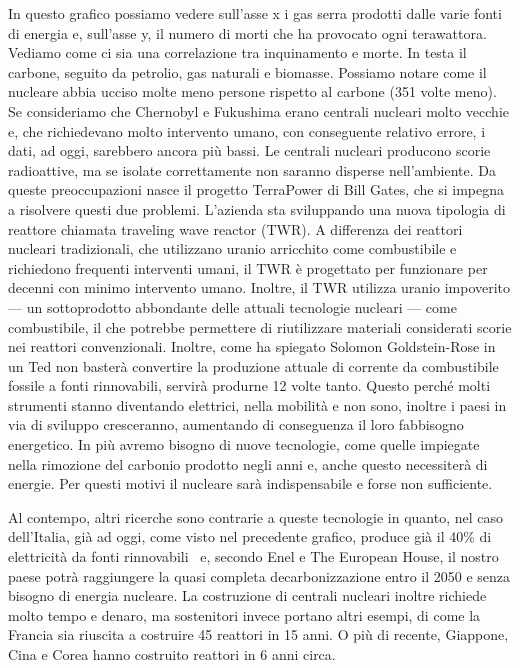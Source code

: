 \documentclass[12pt]{book} %
\begin{document}
In questo grafico possiamo vedere sull'asse x i gas serra prodotti dalle varie fonti di energia e,
sull'asse y, il numero di morti che ha provocato ogni terawattora. Vediamo come ci sia una
correlazione tra inquinamento e morte. In testa il carbone, seguito da petrolio, gas naturali e biomasse. Possiamo
notare come il nucleare abbia ucciso molte meno persone rispetto al carbone (351 volte meno). Se consideriamo che
Chernobyl e Fukushima erano centrali nucleari molto vecchie e, che richiedevano molto intervento umano, con conseguente
relativo errore, i dati, ad oggi, sarebbero ancora più bassi. Le centrali nucleari producono scorie radioattive,
ma se isolate correttamente non saranno disperse nell'ambiente. Da queste preoccupazioni nasce il progetto
TerraPower di Bill Gates, che si impegna a risolvere questi due
problemi. L'azienda sta sviluppando una nuova tipologia di reattore chiamata traveling wave reactor (TWR). A differenza dei reattori nucleari tradizionali, che utilizzano uranio arricchito come combustibile e richiedono frequenti interventi umani, il TWR è progettato per funzionare per decenni con minimo intervento umano.
Inoltre, il TWR utilizza uranio impoverito — un sottoprodotto abbondante delle attuali tecnologie nucleari — come combustibile, il che potrebbe permettere di riutilizzare materiali considerati scorie nei reattori convenzionali. Inoltre, come ha spiegato Solomon Goldstein-Rose in un
Ted non basterà convertire la produzione attuale di corrente da combustibile fossile a fonti rinnovabili, servirà
produrne 12 volte tanto. Questo perché molti strumenti stanno diventando elettrici, nella mobilità e non sono, inoltre
i paesi in via di sviluppo cresceranno, aumentando di conseguenza il loro fabbisogno energetico. In più avremo bisogno
di nuove tecnologie, come quelle impiegate nella rimozione del carbonio prodotto negli anni e, anche questo necessiterà
di energie. Per questi motivi il nucleare sarà indispensabile e forse non sufficiente.

Al contempo, altri ricerche sono contrarie a queste tecnologie in quanto, nel caso dell'Italia, già
ad oggi, come visto nel precedente grafico, produce già il 40\% di elettricità da fonti
rinnovabili
\ e, secondo Enel e The
European House, il nostro paese potrà raggiungere la quasi completa decarbonizzazione entro il 2050 e senza bisogno di
energia
nucleare.
La costruzione di centrali nucleari inoltre richiede molto tempo e denaro, ma sostenitori invece portano altri esempi, di come la Francia sia riuscita a costruire 45 reattori in 15 anni. O più di recente, Giappone, Cina e Corea hanno costruito reattori in 6 anni circa.
\end{document}
